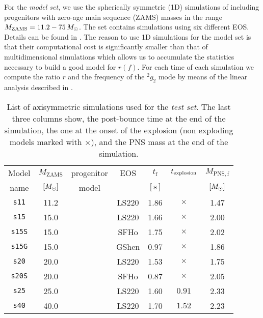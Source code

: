 For the {\it model set}, we use the spherically symmetric (1D) simulations of \citep{Torres:2019a}
including progenitors with zero-age main sequence (ZAMS) masses in the range 
$M_{\mathrm{ZAMS}} = 11.2 - 75 \, M_{\odot}$. The set contains simulations using  
six different EOS. Details can be found in
 \citep{Torres:2019a}. The reason to use 1D simulations for the model set
 is that their computational cost is significantly smaller than that of multidimensional
 simulations which allows us to accumulate the statistics necessary to build a good model for $r(f)$.
 {For each time of each simulation we compute the ratio $r$ and the frequency of the $^2g_2$ mode by means of the linear analysis
 described in \cite{Torres:2018,Torres:2019a,Torres:2019b}. } 
 
 \begin{table}
 \centering
 \begin{tabular}{c|ccc|ccc}
  \hline
  Model & $M_\mathrm{ZAMS} $ & progenitor& EOS & $t_{\mathrm{f}}$& $t_{\rm explosion}$ & $M_{\mathrm{PNS, f}}$\\
  name& $[M_{\odot}]$ & model & & $[\mathrm{s}]$& & $[M_{\odot}]$ 
  \\ 
  \hline
  \texttt{s11} & 11.2 & \cite{Woosley_Heger_Weaver__2002__ReviewsofModernPhysics__The_evolution_and_explosion_of_massive_stars}& LS220 & 1.86 & $\times$ & 1.47 
  \\ 
  \texttt{s15} & 15.0 & \cite{Woosley_Heger_Weaver__2002__ReviewsofModernPhysics__The_evolution_and_explosion_of_massive_stars}& LS220 & 1.66 & $\times$ & 2.00 
    \\ 
  \texttt{s15S} & 15.0 & \cite{Woosley_Heger_Weaver__2002__ReviewsofModernPhysics__The_evolution_and_explosion_of_massive_stars}& SFHo & 1.75 & $\times$ & 2.02 
    \\ 
  \texttt{s15G} & 15.0 & \cite{Woosley_Heger_Weaver__2002__ReviewsofModernPhysics__The_evolution_and_explosion_of_massive_stars}& GShen & 0.97 & $\times$ & 1.86
     \\ 
  \texttt{s20} & 20.0 & \cite{Woosley_Heger_Weaver__2002__ReviewsofModernPhysics__The_evolution_and_explosion_of_massive_stars}& LS220 & 1.53 & $\times$ & 1.75 
    \\ 
  \texttt{s20S} & 20.0 & \cite{Woosley_Heger__2007__physrep__Nucleosynthesisandremnantsinmassivestarsofsolarmetallicity} & SFHo & 0.87 & $\times$ & 2.05 
  \\ 
  \texttt{s25} & 25.0 & \cite{Woosley_Heger_Weaver__2002__ReviewsofModernPhysics__The_evolution_and_explosion_of_massive_stars}& LS220 & 1.60 & $0.91$ & 2.33 
    \\ 
  \texttt{s40} & 40.0 & \cite{Woosley_Heger_Weaver__2002__ReviewsofModernPhysics__The_evolution_and_explosion_of_massive_stars}& LS220 & 1.70 & $1.52$ & 2.23 
    \\ \hline
 \end{tabular}
 \caption{%
  List of axisymmetric simulations {used for the {\it test set}}. 
  {The last three columns show, the post-bounce time at the end of the
  simulation, the one at the onset of the explosion (non exploding models marked
  with $\times$), and the PNS mass at the end of the simulation.}
 }
 \label{Tab:2dSimList}
\end{table}

